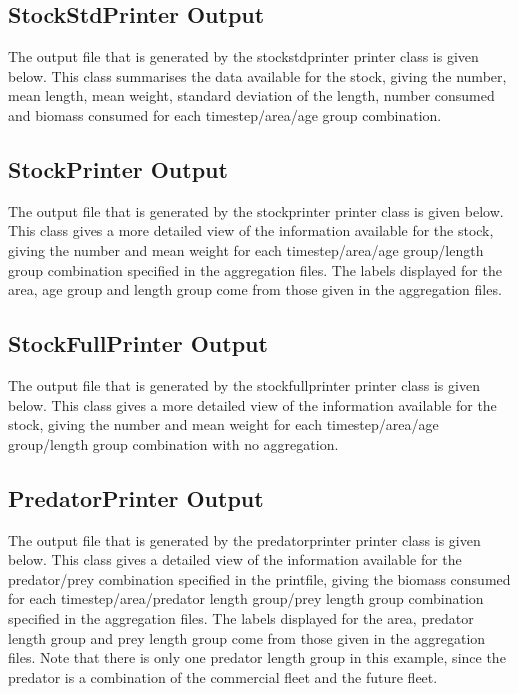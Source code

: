 \documentclass[10pt,twoside]{article}
\begin{document}
{\small }

\subsection{StockStdPrinter Output}
The output file that is generated by the stockstdprinter printer class is given below.  This class summarises the data available for the stock, giving the number, mean length, mean weight, standard deviation of the length, number consumed and biomass consumed for each timestep/area/age group combination.

{\small }

\subsection{StockPrinter Output}
The output file that is generated by the stockprinter printer class is given below.  This class gives a more detailed view of the information available for the stock, giving the number and mean weight for each timestep/area/age group/length group combination specified in the aggregation files.  The labels displayed for the area, age group and length group come from those given in the aggregation files.

{\small }

\subsection{StockFullPrinter Output}
The output file that is generated by the stockfullprinter printer class is given below.  This class gives a more detailed view of the information available for the stock, giving the number and mean weight for each timestep/area/age group/length group combination with no aggregation.

{\small }

\subsection{PredatorPrinter Output}
The output file that is generated by the predatorprinter printer class is given below.  This class gives a detailed view of the information available for the predator/prey combination specified in the printfile, giving the biomass consumed for each timestep/area/predator length group/prey length group combination specified in the aggregation files.  The labels displayed for the area, predator length group and prey length group come from those given in the aggregation files.  Note that there is only one predator length group in this example, since the predator is a combination of the commercial fleet and the future fleet.
\end{document}
